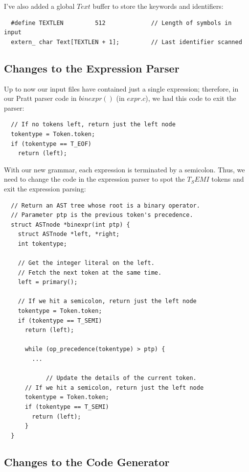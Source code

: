 \documentclass[journal, onecolumn, 12pt]{IEEEtran}
\begin{document}
I've also added a global $Text$ buffer to store the keywords and identifiers:

\begin{lstlisting}
  #define TEXTLEN         512             // Length of symbols in input
  extern_ char Text[TEXTLEN + 1];         // Last identifier scanned
\end{lstlisting}

\subsection{Changes to the Expression Parser}

Up to now our input files have contained just a single expression; therefore, in our Pratt parser code in $binexpr()$ (in $expr.c$), we had this code to exit the parser:

\begin{lstlisting}
  // If no tokens left, return just the left node
  tokentype = Token.token;
  if (tokentype == T_EOF)
    return (left);
\end{lstlisting}

With our new grammar, each expression is terminated by a semicolon. Thus, we need to change the code in the expression parser to spot the $T_SEMI$ tokens and exit the expression parsing:

\begin{lstlisting}
  // Return an AST tree whose root is a binary operator.
  // Parameter ptp is the previous token's precedence.
  struct ASTnode *binexpr(int ptp) {
    struct ASTnode *left, *right;
    int tokentype;
  
    // Get the integer literal on the left.
    // Fetch the next token at the same time.
    left = primary();
  
    // If we hit a semicolon, return just the left node
    tokentype = Token.token;
    if (tokentype == T_SEMI)
      return (left);
  
      while (op_precedence(tokentype) > ptp) {
        ...
  
            // Update the details of the current token.
      // If we hit a semicolon, return just the left node
      tokentype = Token.token;
      if (tokentype == T_SEMI)
        return (left);
      }
  }
\end{lstlisting}

\subsection{Changes to the Code Generator}
\end{document}
